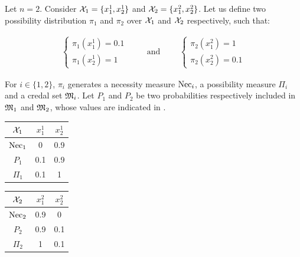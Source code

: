 \begin{example}\label{ex:necessity}
    Let $n=2$. Consider $\mathcal{X}_1=\{x^1_1, x^1_2\}$ and $\mathcal{X}_2=\{x^2_1, x^2_2\}$. Let us define two possibility distribution $\pi_1$ and $\pi_2$ over $\mathcal{X}_1$ and $\mathcal{X}_2$ respectively, such that:

    \begin{eqnarray*}
    \begin{cases}
        \pi_1(x^1_1) = 0.1\\
        \pi_1(x^1_2) = 1
    \end{cases}
    \qquad\text{ and }\qquad
    \begin{cases}
        \pi_2(x^2_1)=1\\
        \pi_2(x^2_2)=0.1
    \end{cases}
    \end{eqnarray*}
    
    For $i\in\{1,2\}$, $\pi_i$ generates a necessity measure $\mathrm{Nec}_i$, a possibility measure $\Pi_i$ and a credal set $\mathfrak{M}_i$. Let $P_1$ and $P_2$ be two probabilities respectively included in $\mathfrak{M}_1$ and $\mathfrak{M}_2$,  whose values are indicated in . 
    
    \begin{center}
    \begin{tabular}{|c|c|c|}
        \hline
        $\mathcal{X}_1$ & $x^1_1$ & $x^1_2$\\
        \hline\hline
        $\mathrm{Nec}_1$ & 0 & 0.9\\
        \hline
        $P_1$  & 0.1 & 0.9\\
        \hline
        $\Pi_1$ & 0.1 & 1\\
        \hline
    \end{tabular}
    \quad
    \begin{tabular}{|c|c|c|}
        \hline
        $\mathcal{X}_2$ & $x^2_1$ & $x^2_2$\\
        \hline\hline
        $\mathrm{Nec}_2$ & 0.9 & 0\\
        \hline
        $P_2$  & 0.9 & 0.1\\
        \hline
        $\Pi_2$ & 1 & 0.1\\
        \hline
    \end{tabular}
    \label{tab:proba_distrib_1}
    \end{center}


\end{example}
